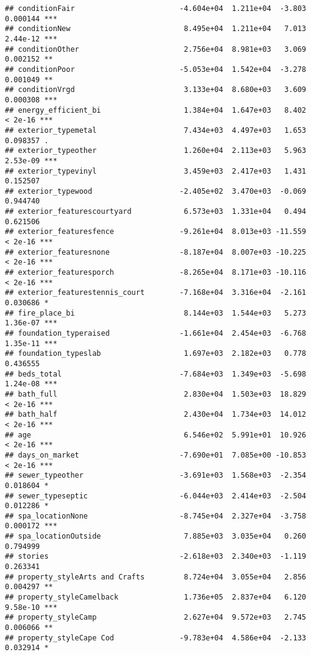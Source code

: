 \documentclass[
]{article}
\begin{document}
\begin{verbatim}
## conditionFair                        -4.604e+04  1.211e+04  -3.803 0.000144 ***
## conditionNew                          8.495e+04  1.211e+04   7.013 2.44e-12 ***
## conditionOther                        2.756e+04  8.981e+03   3.069 0.002152 ** 
## conditionPoor                        -5.053e+04  1.542e+04  -3.278 0.001049 ** 
## conditionVrgd                         3.133e+04  8.680e+03   3.609 0.000308 ***
## energy_efficient_bi                   1.384e+04  1.647e+03   8.402  < 2e-16 ***
## exterior_typemetal                    7.434e+03  4.497e+03   1.653 0.098357 .  
## exterior_typeother                    1.260e+04  2.113e+03   5.963 2.53e-09 ***
## exterior_typevinyl                    3.459e+03  2.417e+03   1.431 0.152507    
## exterior_typewood                    -2.405e+02  3.470e+03  -0.069 0.944740    
## exterior_featurescourtyard            6.573e+03  1.331e+04   0.494 0.621506    
## exterior_featuresfence               -9.261e+04  8.013e+03 -11.559  < 2e-16 ***
## exterior_featuresnone                -8.187e+04  8.007e+03 -10.225  < 2e-16 ***
## exterior_featuresporch               -8.265e+04  8.171e+03 -10.116  < 2e-16 ***
## exterior_featurestennis_court        -7.168e+04  3.316e+04  -2.161 0.030686 *  
## fire_place_bi                         8.144e+03  1.544e+03   5.273 1.36e-07 ***
## foundation_typeraised                -1.661e+04  2.454e+03  -6.768 1.35e-11 ***
## foundation_typeslab                   1.697e+03  2.182e+03   0.778 0.436555    
## beds_total                           -7.684e+03  1.349e+03  -5.698 1.24e-08 ***
## bath_full                             2.830e+04  1.503e+03  18.829  < 2e-16 ***
## bath_half                             2.430e+04  1.734e+03  14.012  < 2e-16 ***
## age                                   6.546e+02  5.991e+01  10.926  < 2e-16 ***
## days_on_market                       -7.690e+01  7.085e+00 -10.853  < 2e-16 ***
## sewer_typeother                      -3.691e+03  1.568e+03  -2.354 0.018604 *  
## sewer_typeseptic                     -6.044e+03  2.414e+03  -2.504 0.012286 *  
## spa_locationNone                     -8.745e+04  2.327e+04  -3.758 0.000172 ***
## spa_locationOutside                   7.885e+03  3.035e+04   0.260 0.794999    
## stories                              -2.618e+03  2.340e+03  -1.119 0.263341    
## property_styleArts and Crafts         8.724e+04  3.055e+04   2.856 0.004297 ** 
## property_styleCamelback               1.736e+05  2.837e+04   6.120 9.58e-10 ***
## property_styleCamp                    2.627e+04  9.572e+03   2.745 0.006066 ** 
## property_styleCape Cod               -9.783e+04  4.586e+04  -2.133 0.032914 *  

\end{verbatim}
\end{document}
